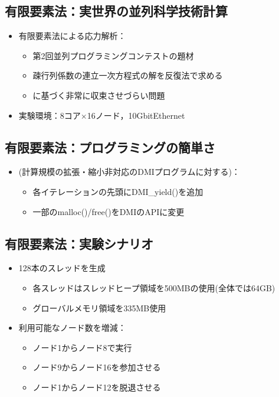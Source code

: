 \documentclass[25pt,papersize,landscape]{jsarticle}
\begin{document}
\subsection{有限要素法：実世界の並列科学技術計算}

\begin{itemize}
\item 有限要素法による応力解析：
  \begin{itemize}
  \item 第2回並列プログラミングコンテストの題材
  \item 疎行列係数の連立一次方程式の解を反復法で求める
  \item {}に基づく非常に収束させづらい問題
  \end{itemize}
\item 実験環境：8コア$\times$16ノード，10GbitEthernet
\end{itemize}


\subsection{有限要素法：プログラミングの簡単さ}

\begin{itemize}
\item (計算規模の拡張・縮小非対応のDMIプログラムに対する)：
  \begin{itemize}
  \item 各イテレーションの先頭にDMI\_yield()を追加
  \item 一部のmalloc()/free()をDMIのAPIに変更
  \end{itemize}
\end{itemize}


\subsection{有限要素法：実験シナリオ}

\begin{itemize}
\item 128本のスレッドを生成
  \begin{itemize}
  \item 各スレッドはスレッドヒープ領域を500MBの使用(全体では64GB)
  \item グローバルメモリ領域を335MB使用
  \end{itemize}
\item 利用可能なノード数を増減：
  \begin{itemize}
  \item ノード1からノード8で実行
  \item ノード9からノード16を参加させる
  \item ノード1からノード12を脱退させる
  \end{itemize}
\end{itemize}
\end{document}
